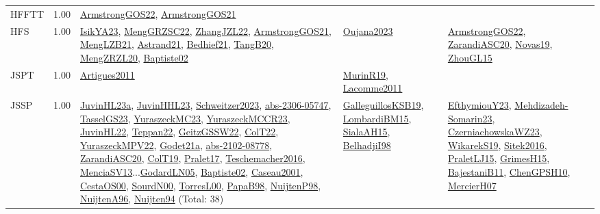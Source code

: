 {\begin{longtable}{p{3cm}r>{\raggedright\arraybackslash}p{6cm}>{\raggedright\arraybackslash}p{6cm}>{\raggedright\arraybackslash}p{8cm}}
\index{HFFTT}\index{Classification!HFFTT}HFFTT &  1.00 & \hyperref[detail:ArmstrongGOS22]{ArmstrongGOS22}, \hyperref[detail:ArmstrongGOS21]{ArmstrongGOS21} &  & \\
\index{HFS}\index{Classification!HFS}HFS &  1.00 & \hyperref[detail:IsikYA23]{IsikYA23}, \hyperref[detail:MengGRZSC22]{MengGRZSC22}, \hyperref[detail:ZhangJZL22]{ZhangJZL22}, \hyperref[detail:ArmstrongGOS21]{ArmstrongGOS21}, \hyperref[detail:MengLZB21]{MengLZB21}, \hyperref[detail:Astrand21]{Astrand21}, \hyperref[detail:Bedhief21]{Bedhief21}, \hyperref[detail:TangB20]{TangB20}, \hyperref[detail:MengZRZL20]{MengZRZL20}, \hyperref[detail:Baptiste02]{Baptiste02} & \hyperref[detail:Oujana2023]{Oujana2023} & \hyperref[detail:ArmstrongGOS22]{ArmstrongGOS22}, \hyperref[detail:ZarandiASC20]{ZarandiASC20}, \hyperref[detail:Novas19]{Novas19}, \hyperref[detail:ZhouGL15]{ZhouGL15}\\
\index{JSPT}\index{Classification!JSPT}JSPT &  1.00 & \hyperref[detail:Artigues2011]{Artigues2011} & \hyperref[detail:MurinR19]{MurinR19}, \hyperref[detail:Lacomme2011]{Lacomme2011} & \\
\index{JSSP}\index{Classification!JSSP}JSSP &  1.00 & \hyperref[detail:JuvinHL23a]{JuvinHL23a}, \hyperref[detail:JuvinHHL23]{JuvinHHL23}, \hyperref[detail:Schweitzer2023]{Schweitzer2023}, \hyperref[detail:abs-2306-05747]{abs-2306-05747}, \hyperref[detail:TasselGS23]{TasselGS23}, \hyperref[detail:YuraszeckMC23]{YuraszeckMC23}, \hyperref[detail:YuraszeckMCCR23]{YuraszeckMCCR23}, \hyperref[detail:JuvinHL22]{JuvinHL22}, \hyperref[detail:Teppan22]{Teppan22}, \hyperref[detail:GeitzGSSW22]{GeitzGSSW22}, \hyperref[detail:ColT22]{ColT22}, \hyperref[detail:YuraszeckMPV22]{YuraszeckMPV22}, \hyperref[detail:Godet21a]{Godet21a}, \hyperref[detail:abs-2102-08778]{abs-2102-08778}, \hyperref[detail:ZarandiASC20]{ZarandiASC20}, \hyperref[detail:ColT19]{ColT19}, \hyperref[detail:Pralet17]{Pralet17}, \hyperref[detail:Teschemacher2016]{Teschemacher2016}, \hyperref[detail:MenciaSV13]{MenciaSV13}...\hyperref[detail:GodardLN05]{GodardLN05}, \hyperref[detail:Baptiste02]{Baptiste02}, \hyperref[detail:Caseau2001]{Caseau2001}, \hyperref[detail:CestaOS00]{CestaOS00}, \hyperref[detail:SourdN00]{SourdN00}, \hyperref[detail:TorresL00]{TorresL00}, \hyperref[detail:PapaB98]{PapaB98}, \hyperref[detail:NuijtenP98]{NuijtenP98}, \hyperref[detail:NuijtenA96]{NuijtenA96}, \hyperref[detail:Nuijten94]{Nuijten94} (Total: 38) & \hyperref[detail:GalleguillosKSB19]{GalleguillosKSB19}, \hyperref[detail:LombardiBM15]{LombardiBM15}, \hyperref[detail:SialaAH15]{SialaAH15}, \hyperref[detail:BelhadjiI98]{BelhadjiI98} & \hyperref[detail:EfthymiouY23]{EfthymiouY23}, \hyperref[detail:Mehdizadeh-Somarin23]{Mehdizadeh-Somarin23}, \hyperref[detail:CzerniachowskaWZ23]{CzerniachowskaWZ23}, \hyperref[detail:WikarekS19]{WikarekS19}, \hyperref[detail:Sitek2016]{Sitek2016}, \hyperref[detail:PraletLJ15]{PraletLJ15}, \hyperref[detail:GrimesH15]{GrimesH15}, \hyperref[detail:BajestaniB11]{BajestaniB11}, \hyperref[detail:ChenGPSH10]{ChenGPSH10}, \hyperref[detail:MercierH07]{MercierH07}\\

\end{longtable}}
